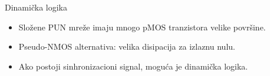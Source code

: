 \begin{frame}[label=09_3-s068]{Dinamička logika}
\begin{itemize}
\item Složene PUN mreže imaju mnogo pMOS tranzistora velike površine.
\item Pseudo-NMOS alternativa: \alert{velika disipacija za izlaznu nulu}.
\item Ako postoji sinhronizacioni signal, moguća je dinamička logika.
\end{itemize}\begin{columns}[c,onlytextwidth]
\begin{center}

\end{center}
\begin{center}

\end{center}
\end{columns}
\end{frame}
